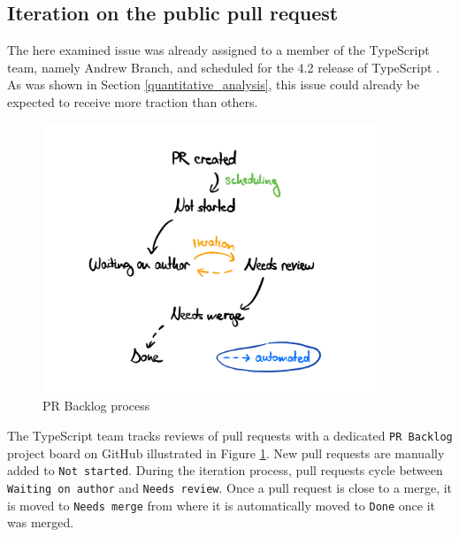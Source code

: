 \documentclass[12pt]{scrartcl}
\def\code#1{\texttt{\frenchspacing#1}}
\begin{document}
\subsection{Iteration on the public pull request}

The here examined issue was already assigned to a member of the TypeScript team, namely Andrew Branch, and scheduled for the 4.2 release of TypeScript \cite{41317}. As was shown in Section \ref{quantitative_analysis}, this issue could already be expected to receive more traction than others.

\begin{figure}
    \centering
    \includegraphics[width=10cm]{images/pr_backlog.png}
    \caption{PR Backlog process}
    \label{fig:pr_backlog}
\end{figure}

The TypeScript team tracks reviews of pull requests with a dedicated \code{PR Backlog} project board on GitHub \cite{PRBacklog} illustrated in Figure \ref{fig:pr_backlog}. New pull requests are manually added to \code{Not started}. During the iteration process, pull requests cycle between \code{Waiting on author} and \code{Needs review}. Once a pull request is close to a merge, it is moved to \code{Needs merge} from where it is automatically moved to \code{Done} once it was merged.
\end{document}
